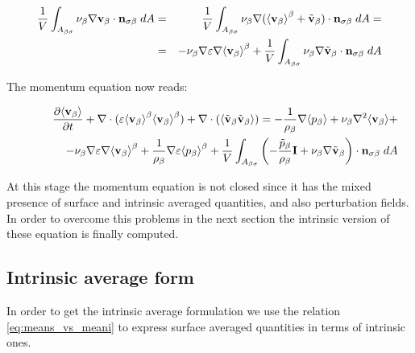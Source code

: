 \begin{eqnarray}
\dfrac{1}{V} \int_{A_{\beta \sigma}} \nu_{\beta} \nabla \textbf{v}_{\beta} \cdot \mathbf{n}_{\sigma \beta} \;dA &=& \dfrac{1}{V} \int_{A_{\beta \sigma}} \nu_{\beta} \nabla ({\left< \textbf{v}_{\beta} \right>}^{\beta} +\tilde{\textbf{v}}_{\beta}) \cdot \mathbf{n}_{\sigma \beta} \;dA =  \nonumber \\
&=& - \nu_{\beta} \nabla \varepsilon \nabla {\left< \textbf{v}_{\beta}\right>}^{\beta} + \dfrac{1}{V} \int_{A_{\beta \sigma}} \nu_{\beta} \nabla \tilde{\textbf{v}}_{\beta} \cdot \mathbf{n}_{\sigma \beta} \;dA
\end{eqnarray}


The momentum equation now reads:

\begin{eqnarray}
\dfrac{\partial {\left< \textbf{v}_{\beta}\right>}}{\partial t} + \nabla \cdot (\varepsilon {\left< \textbf{v}_{\beta}\right>}^{\beta}{\left< \textbf{v}_{\beta} \right>}^{\beta}) + \nabla \cdot ({\left< \tilde{\textbf{v}}_{\beta}\tilde{\textbf{v}}_{\beta} \right>}) = -\dfrac{1}{\rho_{\beta}} \nabla {\left< p_{\beta}\right>} + \nu_{\beta}\nabla^2 {\left< \textbf{v}_{\beta} \right>} + \nonumber \\
\qquad \qquad - \nu_{\beta} \nabla \varepsilon \nabla {\left< \textbf{v}_{\beta}\right>}^{\beta} +\dfrac{1}{\rho_{\beta}}\nabla\varepsilon {\left< p_{\beta}\right>}^{\beta} +\dfrac{1}{V} \displaystyle\int_{A_{\beta \sigma}} \left( -\dfrac{\tilde{p}_{\beta}}{\rho_{\beta}} \mathbf{I} + \nu_{\beta} \nabla \tilde{\textbf{v}}_{\beta}  \right)\cdot \mathbf{n}_{\sigma \beta} \;dA
\label{eq:NS_2}
\end{eqnarray}

At this stage the momentum equation is not closed since it has the mixed presence of surface and intrinsic averaged quantities, and also perturbation fields.
In order to overcome this problems in the next section the intrinsic version of these equation is finally computed. 

\subsection{Intrinsic average form}
In order to get the intrinsic average formulation we use the relation \eqref{eq:means_vs_meani} to express surface averaged quantities in terms of intrinsic ones.

